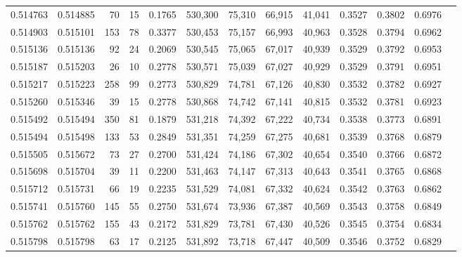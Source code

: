 \begin{tabular}{rrrrrrrrrrrrr}
0.514763 & 0.514885 &    70 &    15 &                                     0.1765 & 530,300 &  75,310 &  66,915 &  41,041 & 0.3527 & 0.3802 & 0.6976 \\
0.514903 & 0.515101 &   153 &    78 &                                     0.3377 & 530,453 &  75,157 &  66,993 &  40,963 & 0.3528 & 0.3794 & 0.6962 \\
0.515136 & 0.515136 &    92 &    24 &                                     0.2069 & 530,545 &  75,065 &  67,017 &  40,939 & 0.3529 & 0.3792 & 0.6953 \\
0.515187 & 0.515203 &    26 &    10 &                                     0.2778 & 530,571 &  75,039 &  67,027 &  40,929 & 0.3529 & 0.3791 & 0.6951 \\
0.515217 & 0.515223 &   258 &    99 &                                     0.2773 & 530,829 &  74,781 &  67,126 &  40,830 & 0.3532 & 0.3782 & 0.6927 \\
0.515260 & 0.515346 &    39 &    15 &                                     0.2778 & 530,868 &  74,742 &  67,141 &  40,815 & 0.3532 & 0.3781 & 0.6923 \\
0.515492 & 0.515494 &   350 &    81 &                                     0.1879 & 531,218 &  74,392 &  67,222 &  40,734 & 0.3538 & 0.3773 & 0.6891 \\
0.515494 & 0.515498 &   133 &    53 &                                     0.2849 & 531,351 &  74,259 &  67,275 &  40,681 & 0.3539 & 0.3768 & 0.6879 \\
0.515505 & 0.515672 &    73 &    27 &                                     0.2700 & 531,424 &  74,186 &  67,302 &  40,654 & 0.3540 & 0.3766 & 0.6872 \\
0.515698 & 0.515704 &    39 &    11 &                                     0.2200 & 531,463 &  74,147 &  67,313 &  40,643 & 0.3541 & 0.3765 & 0.6868 \\
0.515712 & 0.515731 &    66 &    19 &                                     0.2235 & 531,529 &  74,081 &  67,332 &  40,624 & 0.3542 & 0.3763 & 0.6862 \\
0.515741 & 0.515760 &   145 &    55 &                                     0.2750 & 531,674 &  73,936 &  67,387 &  40,569 & 0.3543 & 0.3758 & 0.6849 \\
0.515762 & 0.515762 &   155 &    43 &                                     0.2172 & 531,829 &  73,781 &  67,430 &  40,526 & 0.3545 & 0.3754 & 0.6834 \\
0.515798 & 0.515798 &    63 &    17 &                                     0.2125 & 531,892 &  73,718 &  67,447 &  40,509 & 0.3546 & 0.3752 & 0.6829 \\

\end{tabular}
